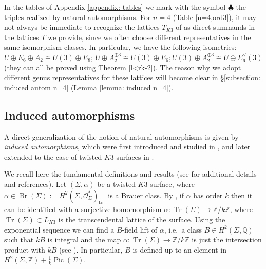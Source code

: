 \documentclass{amsart}
\theoremstyle{definition}
\newcommand{\ra}{\rightarrow}
\newcommand{\IZ}{\mathbb{Z}}
\newcommand{\IQ}{\mathbb{Q}}
\newcommand{\coloneqq}{:=}
\DeclareMathOperator{\pic}{Pic}
\DeclareMathOperator{\br}{Br}
\DeclareMathOperator{\trans}{Tr}
\begin{document}
In the tables of Appendix \ref{appendix: tables} we mark with the symbol $\clubsuit$ the triples realized by natural automorphisms. For $n=4$ (Table \ref{n=4,ord3}), it may not always be immediate to recognize the lattices $T_{K3}$ of \cite[Table 2]{autom_k3_ord3} as direct summands in the lattices $T$ we provide, since we often choose different representatives in the same isomorphism classes. In particular, we have the following isometries: $U \oplus E_6 \oplus A_2 \cong U(3) \oplus E_8$; $U \oplus A_2^{\oplus 3} \cong U(3) \oplus E_6; U(3) \oplus A_2^{\oplus 3} \cong U \oplus E_6^\vee(3)$ (they can all be proved using Theorem \ref{l<rk-2}).  The reason why we adopt different genus representatives for these lattices will become clear in \S \ref{subsection: induced autom n=4} (Lemma \ref{lemma: induced n=4}).  

\subsection{Induced automorphisms} \label{subsect: induced auto}

A direct generalization of the notion of natural automorphisms is given by \emph{induced automorphisms}, which were first introduced and studied in \cite{ow}, \cite{mw} and later extended to the case of twisted $K3$ surfaces in \cite{ckkm}.

We recall here the fundamental definitions and results (see \cite[\S 2.3, \S 3]{ckkm} for additional details and references). Let $\left( \Sigma, \alpha \right)$ be a twisted $K3$ surface, where \mbox{$\alpha \in \br(\Sigma) \coloneqq H^2\left(\Sigma, \mathcal{O}^*_{\Sigma}\right)_{\text{tor}}$} is a Brauer class. By \cite[\S 2]{vg_brauer}, if $\alpha$ has order $k$ then it can be identified with a surjective homomorphism $\alpha: \trans(\Sigma) \ra \IZ/k \IZ$, where $\trans(\Sigma) \subset L_{K3}$ is the transcendental lattice of the surface. Using the exponential sequence we can find a $B$-field lift of $\alpha$, i.e.\ a class $B \in H^2(\Sigma, \IQ)$ such that $kB$ is integral and the map $\alpha: \trans(\Sigma) \ra \IZ/k \IZ$ is just the intersection product with $kB$ (see \cite[\S 3]{stellari_huybrechts}). In particular, $B$ is defined up to an element in $H^2(\Sigma, \IZ) + \frac{1}{k}\pic(\Sigma)$.
\end{document}

